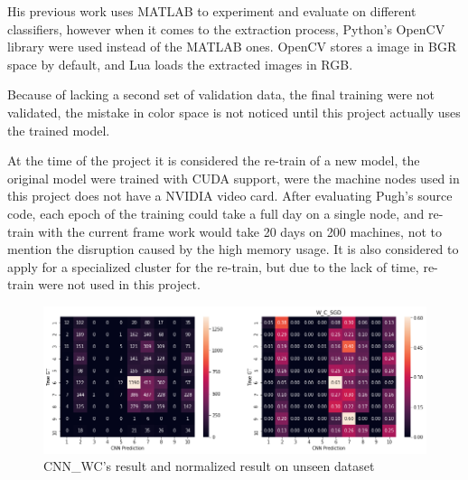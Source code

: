 \documentclass[bsc,logo,twoside,fullspacing,parskip]{infthesis}
\begin{document}
His previous work uses MATLAB to experiment and evaluate on different classifiers, however  when it comes to the extraction process, Python's OpenCV library were used instead of the MATLAB ones.
OpenCV stores a image in BGR space by default, and Lua loads the extracted images in RGB.

Because of lacking a second set of validation data, the final training were not validated, the mistake in color space is not noticed until this project actually uses the trained model.

At the time of the project it is considered the re-train of a new model, the original model were trained with CUDA support, were the machine nodes used in this project does not have a NVIDIA video card. 
After evaluating Pugh's source code, each epoch of the training could take a full day on a single node, and re-train with the current frame work would take 20 days on 200 machines, not to mention the disruption caused by the high memory usage. 
It is also considered to apply for a specialized cluster for the re-train, but due to the lack of time, re-train were not used in this project.




\begin{figure}[h]
\centering
    \includegraphics[scale=0.44]{graph/cnnwc.png}
    \caption{CNN\_WC's result and normalized result on unseen dataset}
    \label{fig:cnnbcacc}
\end{figure} 


\end{document}
